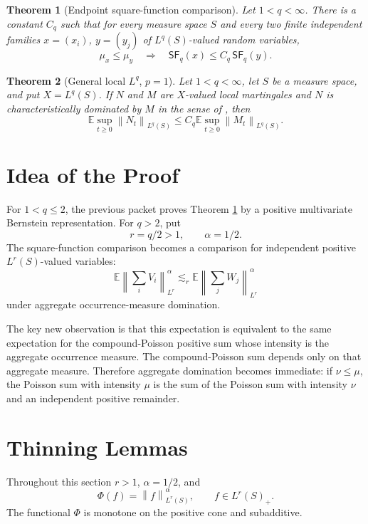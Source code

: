 \documentclass[11pt]{article}
\newtheorem{theorem}{Theorem}
\newcommand{\E}{\mathbb E}
\newcommand{\norm}[1]{\left\lVert #1\right\rVert}
\newcommand{\PhiF}{\Phi}
\begin{document}
\begin{theorem}[Endpoint square-function comparison]
\label{thm:square}
Let \(1<q<\infty\).  There is a constant \(C_q\) such that for every measure
space \(S\) and every two finite independent families \(x=(x_i)\),
\(y=(y_j)\) of \(L^q(S)\)-valued random variables,
\[
  \mu_x\le \mu_y
  \quad\Longrightarrow\quad
  \mathsf{SF}_q(x)\le C_q\,\mathsf{SF}_q(y).
\]
\end{theorem}

\begin{theorem}[General local \(L^q\), \(p=1\)]
\label{thm:main}
Let \(1<q<\infty\), let \(S\) be a measure space, and put \(X=L^q(S)\).  If
\(N\) and \(M\) are \(X\)-valued local martingales and \(N\) is
characteristically dominated by \(M\) in the sense of
\cite[Definition 12.9]{Yaroslavtsev2019}, then
\[
  \E\sup_{t\ge0}\norm{N_t}_{L^q(S)}
  \le
  C_q
  \E\sup_{t\ge0}\norm{M_t}_{L^q(S)}.
\]
\end{theorem}

\section*{Idea of the Proof}

For \(1<q\le2\), the previous packet proves Theorem \ref{thm:square} by a
positive multivariate Bernstein representation.  For \(q>2\), put
\[
  r=q/2>1,\qquad \alpha=1/2.
\]
The square-function comparison becomes a comparison for independent positive
\(L^r(S)\)-valued variables:
\[
  \E\norm{\sum_i V_i}_{L^r}^{\alpha}
  \lesssim_r
  \E\norm{\sum_j W_j}_{L^r}^{\alpha}
\]
under aggregate occurrence-measure domination.

The key new observation is that this expectation is equivalent to the same
expectation for the compound-Poisson positive sum whose intensity is the
aggregate occurrence measure.  The compound-Poisson sum depends only on that
aggregate measure.  Therefore aggregate domination becomes immediate: if
\(\nu\le\mu\), the Poisson sum with intensity \(\mu\) is the sum of the
Poisson sum with intensity \(\nu\) and an independent positive remainder.

\section*{Thinning Lemmas}

Throughout this section \(r>1\), \(\alpha=1/2\), and
\[
  \PhiF(f)=\norm{f}_{L^r(S)}^\alpha,\qquad f\in L^r(S)_+.
\]
The functional \(\PhiF\) is monotone on the positive cone and subadditive.
\end{document}
